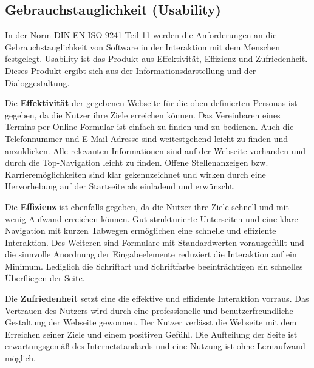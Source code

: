 \subsection{Gebrauchstauglichkeit (Usability)} \label{sec:usability}

In der Norm DIN EN ISO 9241 Teil 11 werden die Anforderungen an die Gebrauchstauglichkeit von Software in der Interaktion mit dem Menschen festgelegt. Usability ist das Produkt aus Effektivität, Effizienz und Zufriedenheit. Dieses Produkt ergibt sich aus der Informationsdarstellung und der Dialoggestaltung. 

Die \textbf{Effektivität} der gegebenen Webseite für die oben definierten Personas ist gegeben, da die Nutzer ihre Ziele erreichen können. Das Vereinbaren eines Termins per Online-Formular ist einfach zu finden und zu bedienen. Auch die Telefonnummer und E-Mail-Adresse sind weitestgehend leicht zu finden und anzuklicken. Alle relevanten Informationen sind auf der Webseite vorhanden und durch die Top-Navigation leicht zu finden. Offene Stellenanzeigen bzw. Karrieremöglichkeiten sind klar gekennzeichnet und wirken durch eine Hervorhebung auf der Startseite als einladend und erwünscht.

Die \textbf{Effizienz} ist ebenfalls gegeben, da die Nutzer ihre Ziele schnell und mit wenig Aufwand erreichen können. Gut strukturierte Unterseiten und eine klare Navigation mit kurzen Tabwegen ermöglichen eine schnelle und effiziente Interaktion. Des Weiteren sind Formulare mit Standardwerten vorausgefüllt und die sinnvolle Anordnung der Eingabeelemente reduziert die Interaktion auf ein Minimum. Lediglich die Schriftart und Schriftfarbe beeinträchtigen ein schnelles Überfliegen der Seite.

Die \textbf{Zufriedenheit} setzt eine die effektive und effiziente Interaktion vorraus. Das Vertrauen des Nutzers wird durch eine professionelle und benutzerfreundliche Gestaltung der Webseite gewonnen. Der Nutzer verlässt die Webseite mit dem Erreichen seiner Ziele und einem positiven Gefühl. Die Aufteilung der Seite ist erwartungsgemäß des Internetstandards und eine Nutzung ist ohne Lernaufwand möglich. 
